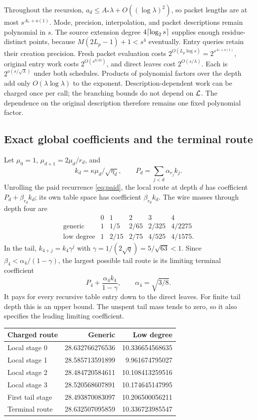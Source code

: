 Throughout the recursion,
$a_d\le A_*\lambda+O((\log\lambda)^2)$, so packet lengths are at
most $s^{A_*+o(1)}$. Mode, precision, interpolation, and packet
descriptions remain polynomial in $s$. The source extension degree
$4\lceil\log_2s\rceil$ supplies enough residue-distinct points, because
$M(2L_p-1)+1<s^4$ eventually. Entry queries retain their creation
precision. Fresh packet evaluation costs
$2^{O(L_p\log s)}=2^{s^{A_*+o(1)}}$, original entry work costs
$2^{O(s^{9/10})}$, and direct leaves cost $2^{O(s/\lambda)}$.
Each is $2^{o(s/\sqrt\lambda)}$ under both schedules. Products of
polynomial factors over the depth add only $O(\lambda\log\lambda)$
to the exponent. Description-dependent work can be charged once per
call; the branching bounds do not depend on $\mathcal L$. The dependence on
the original description therefore remains one fixed polynomial factor.

\subsection{Exact global coefficients and the terminal route}

Let $\mu_0=1$, $\mu_{d+1}=2\mu_d/r_d$, and
\[
 k_d=\kappa\mu_d/\sqrt{\eta_d},\qquad
 P_d=\sum_{j<d}\alpha_{r_j}k_j.
\]
Unrolling the paid recurrence \eqref{eq:paid}, the local route at depth
$d$ has coefficient $P_d+\beta_{r_d}k_d$; its own table space has
coefficient $\beta_{r_d}k_d$. The wire masses through depth four are
\[
 \begin{array}{c|ccccc}
 &0&1&2&3&4\\\hline
 \text{generic}&1&1/5&2/65&2/325&4/2275\\
 \text{low degree}&1&2/15&2/75&4/525&4/1575.
 \end{array}
\]
In the tail, $k_{4+j}=k_4\gamma^j$ with
$\gamma=1/(2\sqrt q)=5/\sqrt{63}<1$. Since
$\beta_4<\alpha_4/(1-\gamma)$, the largest possible tail route is
its limiting terminal coefficient
\begin{equation}\label{eq:terminal}
 P_4+\frac{\alpha_4 k_4}{1-\gamma},\qquad
 \alpha_4=\sqrt{3/8}.
\end{equation}
It pays for every recursive table entry down to the direct leaves. For
finite tail depth this is an upper bound. The unspent tail mass tends to
zero, so it also specifies the leading limiting coefficient.

\begin{center}\small
\begin{tabular}{@{}lrr@{}}
\toprule Charged route & Generic & Low degree\\\midrule
Local stage 0 &28.632766276536&10.336654568635\\
Local stage 1 &28.585713591899&9.961674795027\\
Local stage 2 &28.484720584611&10.108413259516\\
Local stage 3 &28.520568607891&10.174645147995\\
First tail stage &28.493870083097&10.206500056211\\
Terminal route &28.632507095859&10.336723985547\\
\bottomrule
\end{tabular}
\end{center}

